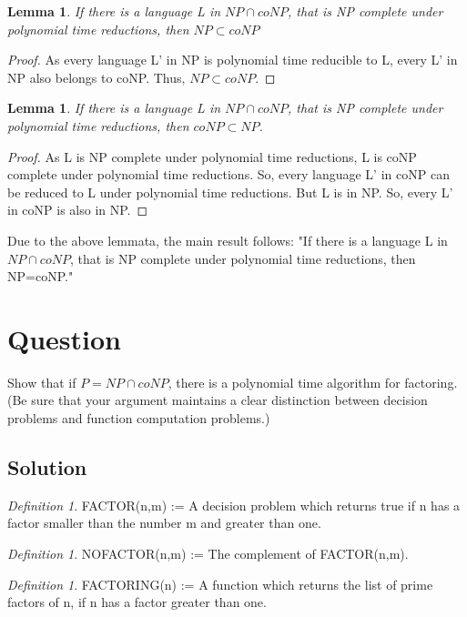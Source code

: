 \documentclass[10pt]{amsart}
\newtheorem{lem}[thm]{Lemma}
\theoremstyle{remark}
\newtheorem{defn}[thm]{Definition}
\begin{document}
\begin{lem}
If there is a language L in $NP \cap coNP$, that is NP complete under polynomial time reductions, then $NP \subset coNP$
\end{lem}

\begin{proof}

As every language L' in NP is polynomial time reducible to L, every L' in NP also belongs to coNP. Thus, $NP \subset coNP$.
\end{proof}

\begin{lem}
If there is a language L in $NP \cap coNP$, that is NP complete under polynomial time reductions, then $coNP \subset NP$.
\end{lem}
\begin{proof}
As L is NP complete under polynomial time reductions, L is coNP complete under polynomial time reductions. So, every language L' in coNP can be reduced to L under polynomial time reductions. But L is in NP. So, every L' in coNP is also in NP.
\end{proof}

Due to the above lemmata, the main result follows: "If there is a language L in $NP \cap coNP$, that is NP complete under polynomial time reductions, then NP=coNP."

\section{Question}
Show that if $P = NP \cap coNP$, there is a polynomial time algorithm for factoring. (Be sure that your argument maintains a clear distinction between decision problems and function computation problems.)

\subsection{Solution}

\begin{defn}
FACTOR(n,m) := A decision problem which returns true if n has a factor smaller than the number m and greater than one.
\end{defn}

\begin{defn}
NOFACTOR(n,m) := The complement of FACTOR(n,m).
\end{defn}

\begin{defn}
FACTORING(n) := A function which returns the list of prime factors of n, if n has a factor  greater than one.
\end{defn}
\end{document}
